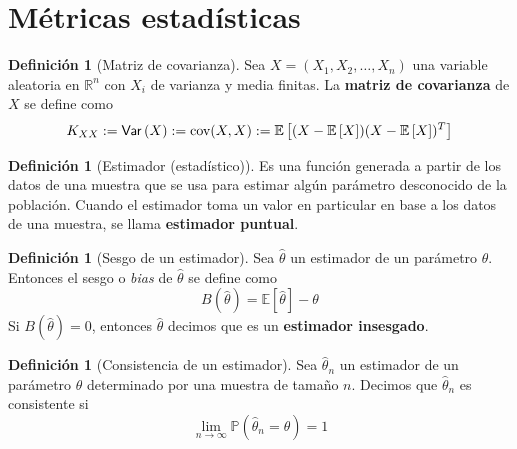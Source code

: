 \documentclass[11pt,a4paper]{book}
\theoremstyle{definition}%
\newtheorem{definicion}[teorema]{Definici\'on}
\newcommand{\EV}[1]{\mathbb{E}\left[#1\right]}
\newcommand{\Prob}[1]{\mathds{P}\left( #1 \right)}
\newcommand{\Var}[1]{\textup{\textsf{Var}}\left(#1\right)}
\begin{document}
        \section{Métricas estadísticas}
            \begin{definicion}[Matriz de covarianza]
                Sea $X=(X_1,X_2,\dots,X_n)$ una variable aleatoria en $\mathbb{R}^n$ con $X_i$ de varianza y media finitas. La \textbf{matriz de covarianza} de $X$ se define como 
                \begin{equation*}
                    K_{XX} := \Var{X} := \textup{cov}(X,X) := \EV{(X-\EV{X})(X-\EV{X})^T}
                \end{equation*}
            \end{definicion}
            \begin{definicion}[Estimador (estadístico)]
                Es una función generada a partir de los datos de una muestra que se usa para estimar algún parámetro desconocido de la población. Cuando el estimador toma un valor en particular en base a los datos de una muestra, se llama \textbf{estimador puntual}.
            \end{definicion}

            \begin{definicion}[Sesgo de un estimador]
                Sea $\hat{\theta}$ un estimador de un parámetro $\theta$. Entonces el sesgo o \textit{bias} de $\hat{\theta}$ se define como
                \begin{equation*}
                    B(\hat{\theta}) = \EV{\hat{\theta}} - \theta
                \end{equation*}
                Si $B(\hat{\theta}) = 0$, entonces $\hat{\theta}$ decimos que es un \textbf{estimador insesgado}.
            \end{definicion}

            \begin{definicion}[Consistencia de un estimador]
                Sea $\hat{\theta}_n$ un estimador de un parámetro $\theta$ determinado por una muestra de tamaño $n$. Decimos que $\hat{\theta}_n$ es consistente si
                \begin{equation*}
                    \lim_{n \to \infty} \Prob{\hat{\theta}_n = \theta} = 1
                \end{equation*}
            \end{definicion}
\end{document}
